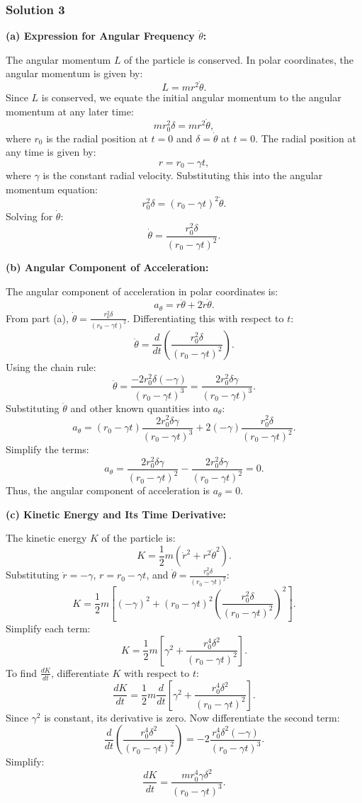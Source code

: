 \documentclass{article}
\begin{document}
\subsubsection{Solution 3}
\textbf{(a) Expression for Angular Frequency \( \dot{\theta} \):}

The angular momentum \( L \) of the particle is conserved. In polar coordinates, the angular momentum is given by:
\[
L = m r^2 \dot{\theta}.
\]
Since \( L \) is conserved, we equate the initial angular momentum to the angular momentum at any later time:
\[
m r_0^2 \delta = m r^2 \dot{\theta},
\]
where \( r_0 \) is the radial position at \( t = 0 \) and \( \delta = \dot{\theta} \) at \( t = 0 \). The radial position at any time is given by:
\[
r = r_0 - \gamma t,
\]
where \( \gamma \) is the constant radial velocity. Substituting this into the angular momentum equation:
\[
r_0^2 \delta = (r_0 - \gamma t)^2 \dot{\theta}.
\]
Solving for \( \dot{\theta} \):
\[
\dot{\theta} = \frac{r_0^2 \delta}{(r_0 - \gamma t)^2}.
\]

\textbf{(b) Angular Component of Acceleration:}

The angular component of acceleration in polar coordinates is:
\[
a_\theta = r \ddot{\theta} + 2 \dot{r} \dot{\theta}.
\]
From part (a), \( \dot{\theta} = \frac{r_0^2 \delta}{(r_0 - \gamma t)^2} \). Differentiating this with respect to \( t \):
\[
\ddot{\theta} = \frac{d}{dt} \left( \frac{r_0^2 \delta}{(r_0 - \gamma t)^2} \right).
\]
Using the chain rule:
\[
\ddot{\theta} = \frac{-2 r_0^2 \delta (-\gamma)}{(r_0 - \gamma t)^3} = \frac{2 r_0^2 \delta \gamma}{(r_0 - \gamma t)^3}.
\]
Substituting \( \ddot{\theta} \) and other known quantities into \( a_\theta \):
\[
a_\theta = (r_0 - \gamma t) \frac{2 r_0^2 \delta \gamma}{(r_0 - \gamma t)^3} + 2(-\gamma) \frac{r_0^2 \delta}{(r_0 - \gamma t)^2}.
\]
Simplify the terms:
\[
a_\theta = \frac{2 r_0^2 \delta \gamma}{(r_0 - \gamma t)^2} - \frac{2 r_0^2 \delta \gamma}{(r_0 - \gamma t)^2} = 0.
\]
Thus, the angular component of acceleration is \( a_\theta = 0 \).

\textbf{(c) Kinetic Energy and Its Time Derivative:}

The kinetic energy \( K \) of the particle is:
\[
K = \frac{1}{2} m \left( \dot{r}^2 + r^2 \dot{\theta}^2 \right).
\]
Substituting \( \dot{r} = -\gamma \), \( r = r_0 - \gamma t \), and \( \dot{\theta} = \frac{r_0^2 \delta}{(r_0 - \gamma t)^2} \):
\[
K = \frac{1}{2} m \left[ (-\gamma)^2 + (r_0 - \gamma t)^2 \left( \frac{r_0^2 \delta}{(r_0 - \gamma t)^2} \right)^2 \right].
\]
Simplify each term:
\[
K = \frac{1}{2} m \left[ \gamma^2 + \frac{r_0^4 \delta^2}{(r_0 - \gamma t)^2} \right].
\]
To find \( \frac{dK}{dt} \), differentiate \( K \) with respect to \( t \):
\[
\frac{dK}{dt} = \frac{1}{2} m \frac{d}{dt} \left[ \gamma^2 + \frac{r_0^4 \delta^2}{(r_0 - \gamma t)^2} \right].
\]
Since \( \gamma^2 \) is constant, its derivative is zero. Now differentiate the second term:
\[
\frac{d}{dt} \left( \frac{r_0^4 \delta^2}{(r_0 - \gamma t)^2} \right) = -2 \frac{r_0^4 \delta^2 (-\gamma)}{(r_0 - \gamma t)^3}.
\]
Simplify:
\[
\frac{dK}{dt} = \frac{m r_0^4 \gamma \delta^2}{(r_0 - \gamma t)^3}.
\]
\end{document}
